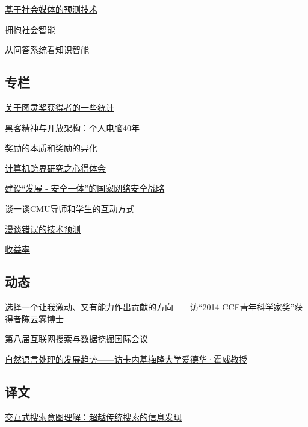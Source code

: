 \documentclass[a4paper]{article}
\begin{document}
\href{http://history.ccf.org.cn/resources/1190201776262/2015/03/12/5.pdf}{基于社会媒体的预测技术}

\href{http://history.ccf.org.cn/resources/1190201776262/2015/03/12/4.pdf}{拥抱社会智能}

\href{http://history.ccf.org.cn/resources/1190201776262/2015/03/12/3.pdf}{从问答系统看知识智能}

\subsection{专栏}
\href{http://history.ccf.org.cn/resources/1190201776262/2015/03/12/8.pdf}{关于图灵奖获得者的一些统计}

\href{http://history.ccf.org.cn/resources/1190201776262/2015/03/12/10.pdf}{黑客精神与开放架构：个人电脑40年}

\href{http://history.ccf.org.cn/resources/1190201776262/2015/03/12/6.pdf}{奖励的本质和奖励的异化}

\href{http://history.ccf.org.cn/resources/1190201776262/2015/03/12/9.pdf}{计算机跨界研究之心得体会}

\href{http://history.ccf.org.cn/resources/1190201776262/2015/03/12/11.pdf}{建设“发展 - 安全一体”的国家网络安全战略}

\href{http://history.ccf.org.cn/resources/1190201776262/2015/03/12/12.pdf}{谈一谈CMU导师和学生的互动方式}

\href{http://history.ccf.org.cn/resources/1190201776262/2015/03/12/7.pdf}{漫谈错误的技术预测}

\href{http://history.ccf.org.cn/resources/1190201776262/2015/03/12/13.pdf}{收益率}

\subsection{动态}
\href{http://history.ccf.org.cn/resources/1190201776262/2015/03/12/14.pdf}{选择一个让我激动、又有能力作出贡献的方向——访“2014 CCF青年科学家奖”获得者陈云霁博士}

\href{http://history.ccf.org.cn/resources/1190201776262/2015/03/12/16.pdf}{第八届互联网搜索与数据挖掘国际会议}

\href{http://history.ccf.org.cn/resources/1190201776262/2015/03/12/15.pdf}{自然语言处理的发展趋势——访卡内基梅隆大学爱德华·霍威教授}

\subsection{译文}
\href{http://history.ccf.org.cn/resources/1190201776262/2015/03/12/17.pdf}{交互式搜索意图理解：超越传统搜索的信息发现}
\end{document}
